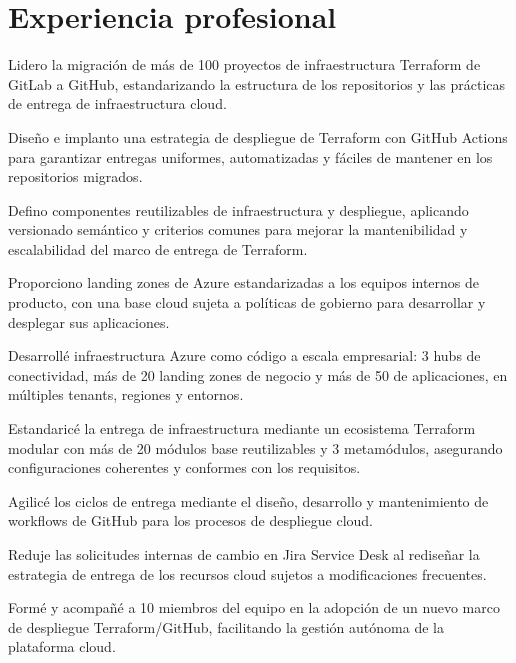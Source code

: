 \documentclass[11pt]{deedy-resume-openfont}
\begin{document}
\section{Experiencia profesional}
\sectionsepsmall
{}\hfill {}
\begin{tightemize}
\item Lidero la migración de más de 100 proyectos de infraestructura Terraform de GitLab a GitHub, estandarizando la estructura de los repositorios y las prácticas de entrega de infraestructura cloud.
\item Diseño e implanto una estrategia de despliegue de Terraform con GitHub Actions para garantizar entregas uniformes, automatizadas y fáciles de mantener en los repositorios migrados.
\item Defino componentes reutilizables de infraestructura y despliegue, aplicando versionado semántico y criterios comunes para mejorar la mantenibilidad y escalabilidad del marco de entrega de Terraform.
\item Proporciono landing zones de Azure estandarizadas a los equipos internos de producto, con una base cloud sujeta a políticas de gobierno para desarrollar y desplegar sus aplicaciones.
\end{tightemize}
\sectionsep
{}
\sectionsep
{}\hfill {}
\begin{tightemize}
\item Desarrollé infraestructura Azure como código a escala empresarial: 3 hubs de conectividad, más de 20 landing zones de negocio y más de 50 de aplicaciones, en múltiples tenants, regiones y entornos.
\item Estandaricé la entrega de infraestructura mediante un ecosistema Terraform modular con más de 20 módulos base reutilizables y 3 metamódulos, asegurando configuraciones coherentes y conformes con los requisitos.
\item Agilicé los ciclos de entrega mediante el diseño, desarrollo y mantenimiento de workflows de GitHub para los procesos de despliegue cloud.
\item Reduje las solicitudes internas de cambio en Jira Service Desk al rediseñar la estrategia de entrega de los recursos cloud sujetos a modificaciones frecuentes.
\item Formé y acompañé a 10 miembros del equipo en la adopción de un nuevo marco de despliegue Terraform/GitHub, facilitando la gestión autónoma de la plataforma cloud.
\end{tightemize}
\sectionsep
{}
\end{document}
